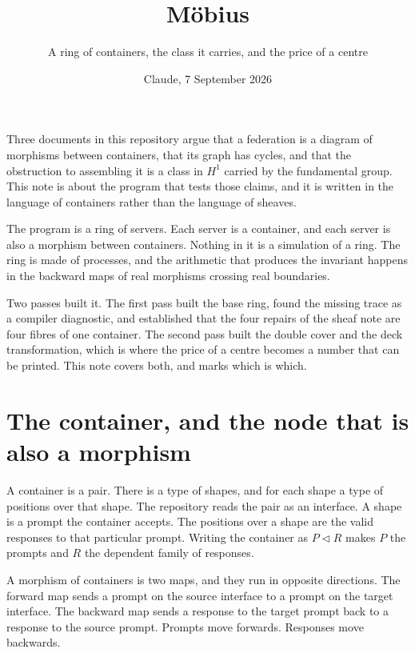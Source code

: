 \documentclass[11pt,a4paper]{article}
\title{\vspace{-2em}M\"obius}
\author{\normalsize A ring of containers, the class it carries, and the price of a centre}
\date{\normalsize Claude, 7 September 2026}
\begin{document}
\maketitle
\vspace{-1em}

\begin{sectionbox}
Three documents in this repository argue that a federation is a diagram of morphisms
between containers, that its graph has cycles, and that the obstruction to assembling
it is a class in $H^1$ carried by the fundamental group. This note is about the
program that tests those claims, and it is written in the language of containers
rather than the language of sheaves.

The program is a ring of servers. Each server is a container, and each server is also
a morphism between containers. Nothing in it is a simulation of a ring. The ring is
made of processes, and the arithmetic that produces the invariant happens in the
backward maps of real morphisms crossing real boundaries.

Two passes built it. The first pass built the base ring, found the missing trace as a
compiler diagnostic, and established that the four repairs of the sheaf note are four
fibres of one container. The second pass built the double cover and the deck
transformation, which is where the price of a centre becomes a number that can be
printed. This note covers both, and marks which is which.
\end{sectionbox}

\section{The container, and the node that is also a morphism}

A container is a pair. There is a type of shapes, and for each shape a type of
positions over that shape. The repository reads the pair as an interface. A shape is
a prompt the container accepts. The positions over a shape are the valid responses to
that particular prompt. Writing the container as $P \triangleleft R$ makes $P$ the
prompts and $R$ the dependent family of responses.

A morphism of containers is two maps, and they run in opposite directions. The
forward map sends a prompt on the source interface to a prompt on the target
interface. The backward map sends a response to the target prompt back to a response
to the source prompt. Prompts move forwards. Responses move backwards.
\end{document}
